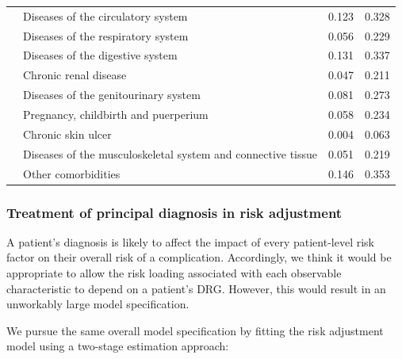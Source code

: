 \documentclass[submission]{grattan}
\begin{document}
\begin{table}
\begin{tabularx}{\linewidth}{lp{.5\linewidth}rr}
&Diseases of the circulatory system             & 0.123 & 0.328\tabularnewline
&Diseases of the respiratory system             & 0.056 & 0.229\tabularnewline
&Diseases of the digestive system               & 0.131 & 0.337\tabularnewline
&Chronic renal disease                          & 0.047 & 0.211\tabularnewline
&Diseases of the genitourinary system           & 0.081 & 0.273\tabularnewline
&Pregnancy, childbirth and puerperium           & 0.058 & 0.234\tabularnewline
&Chronic skin ulcer                             & 0.004 & 0.063\tabularnewline
&Diseases of the musculoskeletal system and connective tissue                             & 0.051 & 0.219\tabularnewline
&Other comorbidities                            & 0.146 & 0.353\tabularnewline
\bottomrule
\end{tabularx}
\end{table}

\subsubsection{Treatment of principal diagnosis in risk adjustment}\label{subsubsec:treatment-of-principal-diagnosis-in-risk-adjustment}

A patient's diagnosis is likely to affect the impact of every patient-level risk factor on their overall risk of a complication.
Accordingly, we think it would be appropriate to allow the risk loading associated with each observable characteristic to depend on a patient's DRG\@.
However, this would result in an unworkably large model specification.

We pursue the same overall model specification by fitting the risk adjustment model using a two-stage estimation approach:
\end{document}
